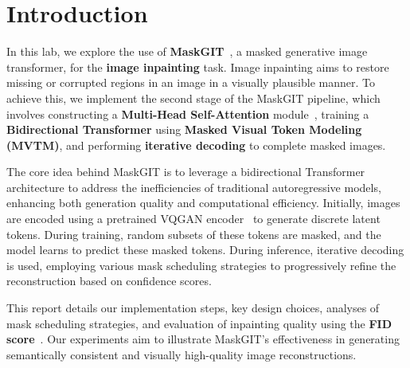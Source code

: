 \section{Introduction}
\label{sec:intro}

In this lab, we explore the use of \textbf{MaskGIT}~\cite{MaskGIT}, a masked generative image transformer, for the \textbf{image inpainting} task.
Image inpainting aims to restore missing or corrupted regions in an image in a visually plausible manner.
To achieve this, we implement the second stage of the MaskGIT pipeline, which involves constructing a \textbf{Multi-Head Self-Attention} module~\cite{Attention}, training a \textbf{Bidirectional Transformer} using \textbf{Masked Visual Token Modeling (MVTM)}, and performing \textbf{iterative decoding} to complete masked images.

The core idea behind MaskGIT is to leverage a bidirectional Transformer architecture to address the inefficiencies of traditional autoregressive models, enhancing both generation quality and computational efficiency.
Initially, images are encoded using a pretrained VQGAN encoder~\cite{VQGAN} to generate discrete latent tokens.
During training, random subsets of these tokens are masked, and the model learns to predict these masked tokens.
During inference, iterative decoding is used, employing various mask scheduling strategies to progressively refine the reconstruction based on confidence scores.

This report details our implementation steps, key design choices, analyses of mask scheduling strategies, and evaluation of inpainting quality using the \textbf{FID score}~\cite{FID}.
Our experiments aim to illustrate MaskGIT's effectiveness in generating semantically consistent and visually high-quality image reconstructions.

